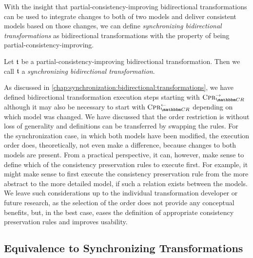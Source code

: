 With the insight that partial-consistency-improving bidirectional transformations can be used to integrate changes to both of two models and deliver consistent models based on those changes, we can define \emph{synchronizing bidirectional transformations} as bidirectional transformations with the property of being partial-consistency-improving.

\begin{definition}
    Let $\transformation{t}$ be a partial-consistency-improving bidirectional transformation.
    Then we call $\transformation{t}$ a \emph{synchronizing bidirectional transformation}.
\end{definition}

As discussed in \autoref{chap:synchronization:bidirectional:transformations}, we have defined bidirectional transformation execution steps starting with $\consistencypreservationrule{\consistencyrelationset{CR}}^{\rightarrow}$ although it may also be necessary to start with $\consistencypreservationrule{\consistencyrelationset{CR}}^{\leftarrow}$ depending on which model was changed.
We have discussed that the order restriction is without loss of generality and definitions can be transferred by swapping the rules.
For the synchronization case, in which both models have been modified, the execution order does, theoretically, not even make a difference, because changes to both models are present.
From a practical perspective, it can, however, make sense to define which of the consistency preservation rules to execute first.
For example, it might make sense to first execute the consistency preservation rule from the more abstract to the more detailed model, if such a relation exists between the models.
We leave such considerations up to the individual transformation developer or future research, as the selection of the order does not provide any conceptual benefits, but, in the best case, eases the definition of appropriate consistency preservation rules and improves usability.


\subsection{Equivalence to Synchronizing Transformations}

